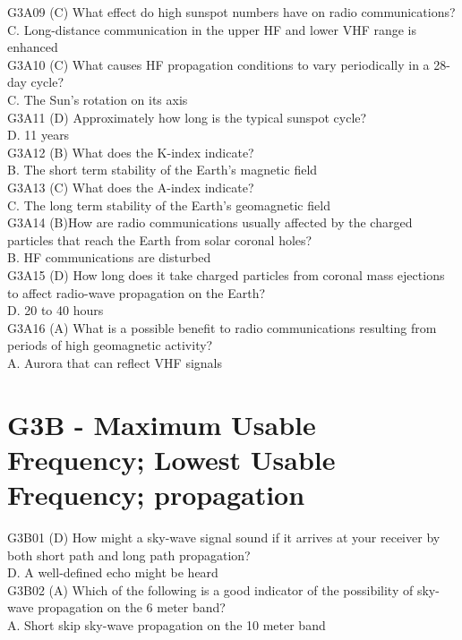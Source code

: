 \documentclass[12pt,letterpaper]{report}
\begin{document}
G3A09 (C) What effect do high sunspot numbers have on radio communications?\\
C. Long-distance communication in the upper HF and lower VHF range is enhanced\\

G3A10 (C) What causes HF propagation conditions to vary periodically in a 28-day cycle?\\
C. The Sun's rotation on its axis\\

G3A11 (D) Approximately how long is the typical sunspot cycle?\\
D. 11 years\\

G3A12 (B) What does the K-index indicate?\\
B. The short term stability of the Earth's magnetic field\\

G3A13 (C) What does the A-index indicate? \\
C. The long term stability of the Earth's geomagnetic field\\

G3A14 (B)How are radio communications usually affected by the charged particles that reach the Earth from solar coronal holes?\\
B. HF communications are disturbed\\

G3A15 (D) How long does it take charged particles from coronal mass ejections to affect radio-wave propagation on the Earth?\\
D. 20 to 40 hours\\

G3A16 (A) What is a possible benefit to radio communications resulting from periods of high geomagnetic activity?\\
A. Aurora that can reflect VHF signals\\

\section{G3B - Maximum Usable Frequency; Lowest Usable Frequency; propagation}

G3B01 (D) How might a sky-wave signal sound if it arrives at your receiver by both short path and long path propagation?\\
D. A well-defined echo might be heard\\

G3B02 (A) 
Which of the following is a good indicator of the possibility of sky-wave propagation on the 6 meter band?\\
A. Short skip sky-wave propagation on the 10 meter band\\
\end{document}
